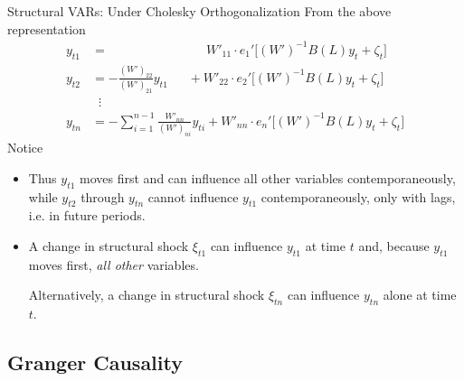 \documentclass[aspectratio=169, handout]{beamer}
\begin{document}
{\footnotesize
\begin{frame}{Structural VARs: Under Cholesky Orthogonalization}
From the above representation
\begin{align*}
  y_{t1}
  &=
  \qquad\quad
  \qquad\quad
  \quad
  \,\;\;
  W'_{11}
  \cdot
  e_1'\big[(W')^{-1}B(L)y_t + \zeta_t\big]
  \\
  y_{t2}
  &=
  -
  \frac{(W')_{22}}{(W')_{21}}
  y_{t1}
  \quad
  \;\;
  +
  W'_{22}
  \cdot
  e_2'\big[(W')^{-1}B(L)y_t + \zeta_t\big]
  \\
  & \;\;\vdots
  \\
  y_{tn}
  &=
  -
  \sum_{i=1}^{n-1}
  \frac{W'_{nn}}{(W')_{ni}}
  y_{ti}
  +
  W'_{nn}\cdot e_n'\big[(W')^{-1}B(L)y_t + \zeta_t\big]
\end{align*}
Notice
\begin{itemize}
  \item Thus $y_{t1}$ \alert{moves first} and can influence all other
    variables \alert{contemporaneously}, while $y_{t2}$ through $y_{tn}$
    cannot influence $y_{t1}$ contemporaneously, only with lags, i.e. in
    future periods.

  \pause
  \item A change in structural shock $\xi_{t1}$ can influence $y_{t1}$
    at time $t$ and, because $y_{t1}$ moves first, \emph{all other}
    variables.

    Alternatively, a change in structural shock $\xi_{tn}$ can influence
    $y_{tn}$ alone at time $t$.
\end{itemize}
\end{frame}
}


\subsection{Granger Causality}
\end{document}
